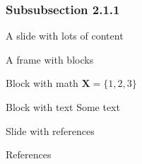 \documentclass[12pt, t]{beamer}
\begin{document}
\subsubsection{Subsubsection 2.1.1}

\begin{frame}{A slide with lots of content}
    \lipsum[2]
\end{frame}

\begin{frame}[c]{A frame with blocks}
	\begin{block}{Block with math}
		$\mathbf{X} = \{1, 2, 3\}$
	\end{block}
	\begin{block}{Block with text}
		Some text
	\end{block}
\end{frame}

\begin{frame}{Slide with references}
	\centering \cite{upper1974unsuccessful, didden2007multisite}
\end{frame}

\begin{frame}[allowframebreaks]{References}
\end{frame}
\end{document}
